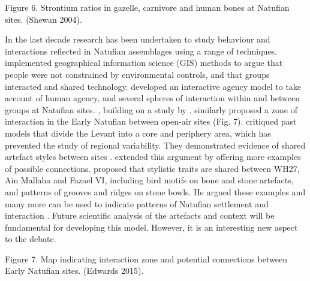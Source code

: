 \documentclass[%
	]{ijsra}
\begin{document}
Figure 6. Strontium ratios in gazelle, carnivore and human bones at Natufian sites. (Shewan 2004).


In the last decade research has been undertaken to study behaviour and interactions reflected in Natufian assemblages using a range of techniques. \textcite{Parslow_2009} implemented geographical information science (GIS) methods to argue that people were not constrained by environmental controls, and that groups interacted and shared technology. 
\textcite[3]{Parslow_2009} developed an interactive agency model to take account of human agency, and several spheres of interaction within and between groups at Natufian sites. 
\textcite{Edwards_2015}, building on a study by \textcite{Belfer-Cohen_2013}, similarly proposed a zone of interaction in the Early Natufian between open-air sites (Fig. 7). 
\textcite[547]{Belfer-Cohen_2013} critiqued past models that divide the Levant into a core and periphery area, which has prevented the study of regional variability. 
They demonstrated evidence of shared artefact styles between sites \textcite[546]{Belfer-Cohen_2013}. 
\textcite[272]{Edwards_2015} extended this argument by offering more examples of possible connections. 
\textcite[276]{Edwards_2015} proposed that stylistic traits are shared between WH27, Ain Mallaha and Fazael VI, including bird motifs on bone and stone artefacts, and patterns of grooves and ridges on stone bowls. 
He argued these examples and many more can be used to indicate patterns of Natufian settlement and interaction \parencite[280]{Edwards_2015}. Future scientific analysis of the artefacts and context will be fundamental for developing this model. However, it is an interesting new aspect to the debate.

Figure 7. Map indicating interaction zone and potential connections between Early Natufian sites. (Edwards 2015).

\end{document}
